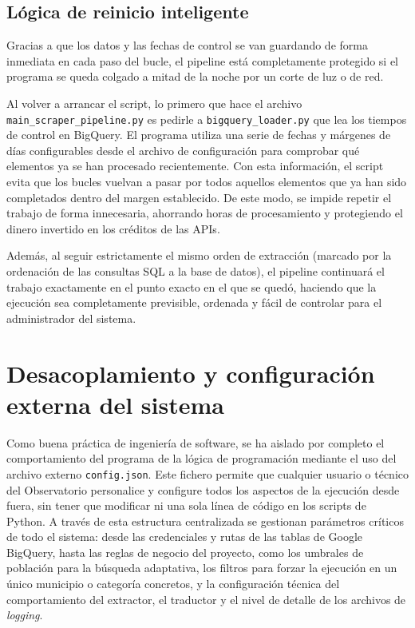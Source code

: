 \subsection{Lógica de reinicio inteligente}
Gracias a que los datos y las fechas de control se van guardando de forma inmediata en cada paso del bucle, el pipeline está completamente protegido si el programa se queda colgado a mitad de la noche por un corte de luz o de red. 

Al volver a arrancar el script, lo primero que hace el archivo \texttt{main\_scraper\-\_pipeline.py} es pedirle a \texttt{bigquery\_loader.py} que lea los tiempos de control en BigQuery. El programa utiliza una serie de fechas y márgenes de días configurables desde el archivo de configuración para comprobar qué elementos ya se han procesado recientemente. Con esta información, el script evita que los bucles vuelvan a pasar por todos aquellos elementos que ya han sido completados dentro del margen establecido. De este modo, se impide repetir el trabajo de forma innecesaria, ahorrando horas de procesamiento y protegiendo el dinero invertido en los créditos de las APIs. 

Además, al seguir estrictamente el mismo orden de extracción (marcado por la ordenación de las consultas SQL a la base de datos), el pipeline continuará el trabajo exactamente en el punto exacto en el que se quedó, haciendo que la ejecución sea completamente previsible, ordenada y fácil de controlar para el administrador del sistema.

\section{Desacoplamiento y configuración externa del sistema}
Como buena práctica de ingeniería de software, se ha aislado por completo el comportamiento del programa de la lógica de programación mediante el uso del archivo externo \texttt{config.json}. Este fichero permite que cualquier usuario o técnico del Observatorio personalice y configure todos los aspectos de la ejecución desde fuera, sin tener que modificar ni una sola línea de código en los scripts de Python. A través de esta estructura centralizada se gestionan parámetros críticos de todo el sistema: desde las credenciales y rutas de las tablas de Google BigQuery, hasta las reglas de negocio del proyecto, como los umbrales de población para la búsqueda adaptativa, los filtros para forzar la ejecución en un único municipio o categoría concretos, y la configuración técnica del comportamiento del extractor, el traductor y el nivel de detalle de los archivos de \textit{logging}.

